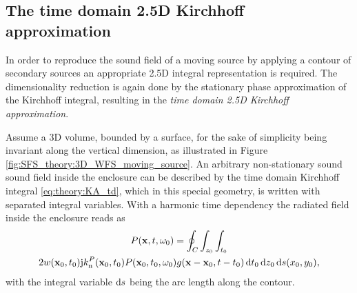 \subsection{The time domain 2.5D Kirchhoff approximation}

In order to reproduce the sound field of a moving source by applying a contour of secondary sources an appropriate 2.5D integral representation is required.
The dimensionality reduction is again done by the stationary phase approximation of the Kirchhoff integral, resulting in the \emph{time domain 2.5D Kirchhoff approximation}.

Assume a 3D volume, bounded by a surface, for the sake of simplicity being invariant along the vertical dimension, as illustrated in Figure \ref{fig:SFS_theory:3D_WFS_moving_source}.
An arbitrary non-stationary sound sound field inside the enclosure can be described by the time domain Kirchhoff integral \eqref{eq:theory:KA_td}, which in this special geometry, is written with separated integral variables.
With a harmonic time dependency the radiated field inside the enclosure reads as
\begin{multline}
\displaystyle
P(\mathbf{x},t,\omega_0) = 
\oint_{C} \int_{z_0} \int_{t_0} \\
2 w(\mathbf{x}_0,t_0) \mathrm{j} k_{\mathrm{n}}^P(\mathbf{x}_0,t_0) 	
P(\mathbf{x}_0,t_0,\omega_0) g(\mathbf{x}-\mathbf{x}_0,t-t_0) \, \mathrm{d} t_0 \, \mathrm{d} z_0 \, \mathrm{d} s(x_0, y_0),
\label{Eq:SFS_theory:Kirchhoff_spec_geom_td}
\end{multline}
with the integral variable $\mathrm{d} s$ being the arc length along the contour.
%

